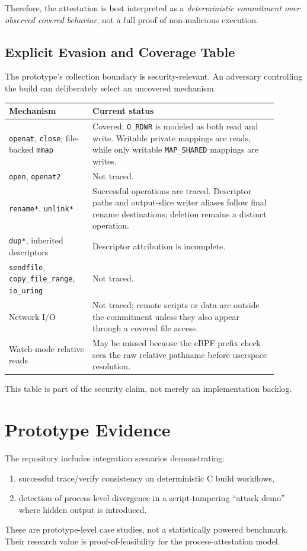 \documentclass[11pt]{article}
\begin{document}
Therefore, the attestation is best interpreted as a \emph{deterministic commitment over observed covered behavior}, not a full proof of non-malicious execution.

\subsection{Explicit Evasion and Coverage Table}
The prototype's collection boundary is security-relevant. An adversary controlling the build can deliberately select an uncovered mechanism.

\begin{center}
\begin{tabular}{p{0.28\linewidth}p{0.62\linewidth}}
\toprule
Mechanism & Current status \\
\midrule
\texttt{openat}, \texttt{close}, file-backed \texttt{mmap} & Covered; \texttt{O\_RDWR} is modeled as both read and write. Writable private mappings are reads, while only writable \texttt{MAP\_SHARED} mappings are writes. \\
\texttt{open}, \texttt{openat2} & Not traced. \\
\texttt{rename*}, \texttt{unlink*} & Successful operations are traced. Descriptor paths and output-slice writer aliases follow final rename destinations; deletion remains a distinct operation. \\
\texttt{dup*}, inherited descriptors & Descriptor attribution is incomplete. \\
\texttt{sendfile}, \texttt{copy\_file\_range}, \texttt{io\_uring} & Not traced. \\
Network I/O & Not traced; remote scripts or data are outside the commitment unless they also appear through a covered file access. \\
Watch-mode relative reads & May be missed because the eBPF prefix check sees the raw relative pathname before userspace resolution. \\
\bottomrule
\end{tabular}
\end{center}

This table is part of the security claim, not merely an implementation backlog.

\section{Prototype Evidence}
The repository includes integration scenarios demonstrating:
\begin{enumerate}
  \item successful trace/verify consistency on deterministic C build workflows,
  \item detection of process-level divergence in a script-tampering ``attack demo'' where hidden output is introduced.
\end{enumerate}
These are prototype-level case studies, not a statistically powered benchmark. Their research value is proof-of-feasibility for the process-attestation model.
\end{document}

